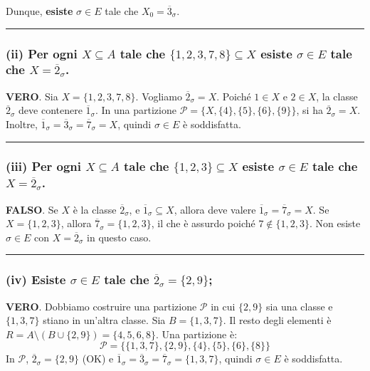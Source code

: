 Dunque, \textbf{esiste} $\sigma \in E$ tale che $X_0 = \overline{3}_{\sigma}$.

\vspace{0.3cm}
\hrule
\vspace{0.3cm}

\subsubsection*{(ii) Per ogni $X \subseteq A$ tale che $\{1, 2, 3, 7, 8\} \subseteq X$ esiste $\sigma \in E$ tale che $X = \overline{2}_{\sigma}$.}
\textbf{VERO}.
Sia $X = \{1, 2, 3, 7, 8\}$. Vogliamo $\overline{2}_{\sigma} = X$.
Poiché $1 \in X$ e $2 \in X$, la classe $\overline{2}_{\sigma}$ deve contenere $\overline{1}_{\sigma}$.
In una partizione $\mathcal{P} = \{X, \{4\}, \{5\}, \{6\}, \{9\}\}$, si ha $\overline{2}_{\sigma} = X$.
Inoltre, $\overline{1}_{\sigma} = \overline{3}_{\sigma} = \overline{7}_{\sigma} = X$, quindi $\sigma \in E$ è soddisfatta.

\vspace{0.3cm}
\hrule
\vspace{0.3cm}

\subsubsection*{(iii) Per ogni $X \subseteq A$ tale che $\{1, 2, 3\} \subseteq X$ esiste $\sigma \in E$ tale che $X = \overline{2}_{\sigma}$.}
\textbf{FALSO}.
Se $X$ è la classe $\overline{2}_{\sigma}$, e $\overline{1}_{\sigma} \subseteq X$, allora deve valere $\overline{1}_{\sigma} = \overline{7}_{\sigma} = X$.
Se $X = \{1, 2, 3\}$, allora $\overline{7}_{\sigma} = \{1, 2, 3\}$, il che è assurdo poiché $7 \notin \{1, 2, 3\}$. Non esiste $\sigma \in E$ con $X = \overline{2}_{\sigma}$ in questo caso.

\vspace{0.3cm}
\hrule
\vspace{0.3cm}

\subsubsection*{(iv) Esiste $\sigma \in E$ tale che $\overline{2}_{\sigma} = \{2, 9\}$;}
\textbf{VERO}.
Dobbiamo costruire una partizione $\mathcal{P}$ in cui $\{2, 9\}$ sia una classe e $\{1, 3, 7\}$ stiano in un'altra classe.
Sia $B = \{1, 3, 7\}$. Il resto degli elementi è $R = A \setminus (B \cup \{2, 9\}) = \{4, 5, 6, 8\}$.
Una partizione è:
$$ \mathcal{P} = \{\{1, 3, 7\}, \{2, 9\}, \{4\}, \{5\}, \{6\}, \{8\}\} $$
In $\mathcal{P}$, $\overline{2}_{\sigma} = \{2, 9\}$ (OK) e $\overline{1}_{\sigma} = \overline{3}_{\sigma} = \overline{7}_{\sigma} = \{1, 3, 7\}$, quindi $\sigma \in E$ è soddisfatta.

